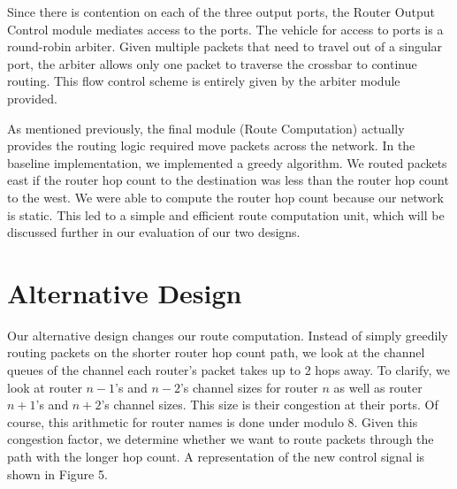 \documentclass[10pt]{article}
\begin{document}
Since there is contention on each of the three output ports, the 
Router Output Control module mediates access to the ports. 
The vehicle for access to ports is a round-robin arbiter. 
Given multiple packets that need to travel out of a singular port, the arbiter
allows only one packet to traverse the crossbar to continue routing. 
This flow control scheme is entirely given by the arbiter module provided. \par

As mentioned previously, the final module (Route Computation) actually provides
the routing logic required move packets across the network.
In the baseline implementation, we implemented a greedy algorithm.
We routed packets east if the router hop count to the destination was less than
the router hop count to the west. 
We were able to compute the router hop count because our network is static. 
This led to a simple and efficient route computation unit, which will be 
discussed further in our evaluation of our two designs.

\section{Alternative Design}

Our alternative design changes our route computation. 
Instead of simply greedily routing packets on the shorter router hop count
path, we look at the channel queues of the channel each router's packet 
takes up to 2 hops away. 
To clarify, we look at router $n-1$'s and $n-2$'s channel sizes 
for router $n$ as well as router $n+1$'s and $n+2$'s channel sizes.
This size is their congestion at their ports. 
Of course, this arithmetic for router names is done under modulo 8. 
Given this congestion factor, we determine whether we want to route packets 
through the path with the longer hop count. 
A representation of the new control signal is shown in Figure 5.\par
\end{document}
